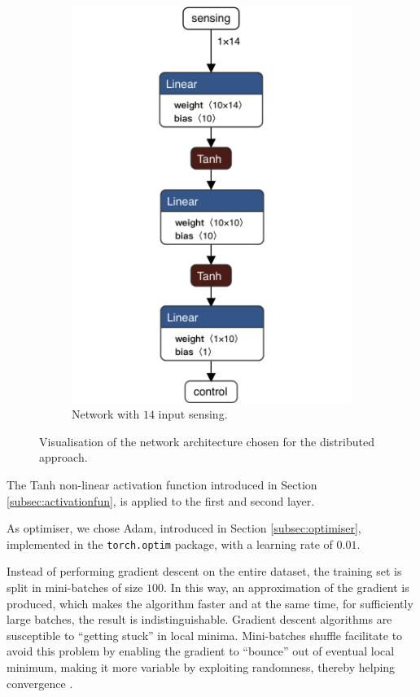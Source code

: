 \begin{figure}[htb]
\begin{subfigure}[h]{0.495\textwidth}
		\includegraphics[width=.8\textwidth]{contents/images/task1distributed_all@4x}
		\caption{Network with $14$ input sensing.}
		\label{fig:singlenet-d14distributed1}
	\end{subfigure}
	\caption[Network architectures for the distributed approach.]{Visualisation of 
		the network architecture chosen for the distributed approach.}
	\label{fig:singlenetdistributed1}
\end{figure}

The Tanh non-linear activation function introduced in Section 
\ref{subsec:activationfun}, is applied to the first and second layer. 

As optimiser, we chose Adam, introduced in Section \ref{subsec:optimiser}, 
implemented in the \texttt{torch.optim} package, with a learning rate of $0.01$. 

Instead of performing gradient descent on the entire dataset, the training set is 
split in mini-batches of size $100$. In this way, an approximation of the gradient 
is produced, which makes the algorithm faster and at the same time, for 
sufficiently large batches, the result is indistinguishable.
Gradient descent algorithms are susceptible to ``getting stuck'' in local minima.
Mini-batches shuffle facilitate to avoid this problem by enabling the gradient to 
``bounce'' out of eventual local minimum, making it more variable by exploiting 
randomness, thereby helping convergence \cite[][]{meng2019convergence}.

